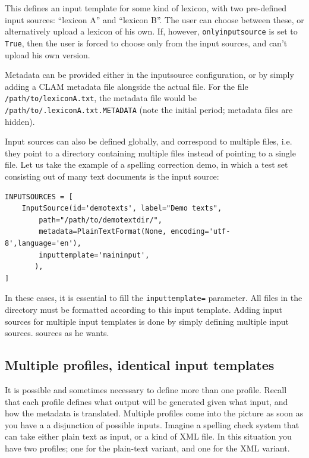 \documentclass[a4paper,12pt]{report}
\begin{document}
This defines an input template for some kind of lexicon, with two pre-defined
input sources: ``lexicon A'' and ``lexicon B''. The user can choose between
these, or alternatively upload a lexicon of his own. If, however,
\texttt{onlyinputsource} is set to \texttt{True}, then the user is forced to
choose only from the input sources, and can't upload his own version. 

Metadata can be provided either in the inputsource configuration, or by simply
adding a CLAM metadata file alongside the actual file. For the file
\texttt{/path/to/lexiconA.txt}, the metadata file would be
\texttt{/path/to/.lexiconA.txt.METADATA} (note the initial period; metadata
files are hidden). 

Input sources can also be defined globally, and correspond to multiple files,
i.e. they point to a directory containing multiple files instead of pointing to
a single file. Let us take the example of a spelling correction demo, in which
a test set consisting out of many text documents is the input source:

\begin{verbatim}
INPUTSOURCES = [
    InputSource(id='demotexts', label="Demo texts",
        path="/path/to/demotextdir/", 
        metadata=PlainTextFormat(None, encoding='utf-8',language='en'),
        inputtemplate='maininput',
       ),
]
\end{verbatim}

In these cases, it is essential to fill the \texttt{inputtemplate=} parameter.
All files in the directory must be formatted according to this input template.
Adding input sources for multiple input templates is done by simply defining
multiple input sources. %
sources as he wants.

\subsection{Multiple profiles, identical input templates}

It is possible and sometimes necessary to define more than one profile. Recall
that each profile defines what output will be generated given what input, and
how the metadata is translated. Multiple profiles come into the picture as soon
as you have a a disjunction of possible inputs. Imagine a spelling check system
that can take either plain text as input, or a kind of XML file. In this
situation you have two profiles; one for the plain-text variant, and one for
the XML variant. 
\end{document}
